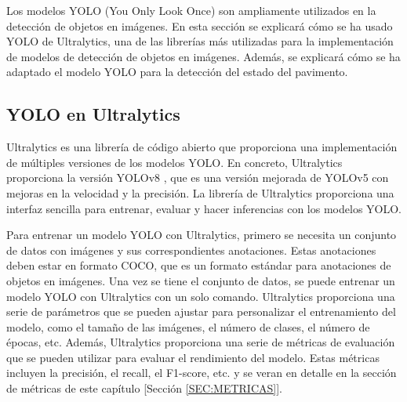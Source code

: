 Los modelos YOLO (You Only Look Once) son ampliamente utilizados en la detección de objetos en imágenes. En esta sección se explicará cómo se ha usado YOLO de Ultralytics, una de las librerías más utilizadas para la implementación de modelos de detección de objetos en imágenes. Además, se explicará cómo se ha adaptado el modelo YOLO para la detección del estado del pavimento.

\subsection{YOLO en Ultralytics}

Ultralytics es una librería de código abierto que proporciona una implementación de múltiples versiones de los modelos YOLO. En concreto, Ultralytics proporciona la versión YOLOv8 \cite{yolov8_ultralytics}, que es una versión mejorada de YOLOv5 con mejoras en la velocidad y la precisión. La librería de Ultralytics proporciona una interfaz sencilla para entrenar, evaluar y hacer inferencias con los modelos YOLO.

Para entrenar un modelo YOLO con Ultralytics, primero se necesita un conjunto de datos con imágenes y sus correspondientes anotaciones. Estas anotaciones deben estar en formato COCO, que es un formato estándar para anotaciones de objetos en imágenes. Una vez se tiene el conjunto de datos, se puede entrenar un modelo YOLO con Ultralytics con un solo comando. Ultralytics proporciona una serie de parámetros que se pueden ajustar para personalizar el entrenamiento del modelo, como el tamaño de las imágenes, el número de clases, el número de épocas, etc. Además, Ultralytics proporciona una serie de métricas de evaluación que se pueden utilizar para evaluar el rendimiento del modelo. Estas métricas incluyen la precisión, el recall, el F1-score, etc. y se veran en detalle en la sección de métricas de este capítulo [Sección \ref{SEC:METRICAS}].
